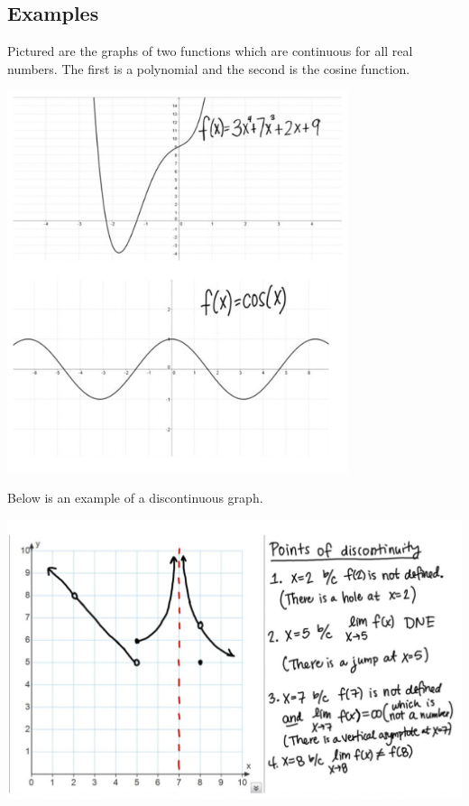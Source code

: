 \documentclass{ximera}
\begin{document}
\subsection{Examples}

Pictured are the graphs of two functions which are continuous for all real numbers. The first is a polynomial and the second is the cosine function.

\begin{image}
    \includegraphics[width=0.75\textwidth]{graph5.png}
\end{image}

Below is an example of a discontinuous graph.

\begin{image}
    \includegraphics[width=\textwidth]{graph6.png}
\end{image}
\end{document}
